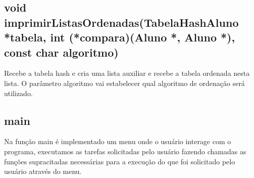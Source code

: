 \documentclass{article}
\begin{document}
\subsection{void imprimirListasOrdenadas(TabelaHashAluno *tabela, int (*compara)(Aluno *, Aluno *), const char algoritmo)}
Recebe a tabela hash e cria uma lista auxiliar e recebe a tabela ordenada nesta lista. O parâmetro algoritmo vai estabelecer qual algoritmo de ordenação será utilizado.

\subsection{main}
Na função main é implementado um menu onde o usuário interage com o programa, executamos as tarefas solicitadas pelo usuário fazendo chamadas as funções supracitadas necessárias para a execução do que foi solicitado pelo usuário através do menu. 
\end{document}
